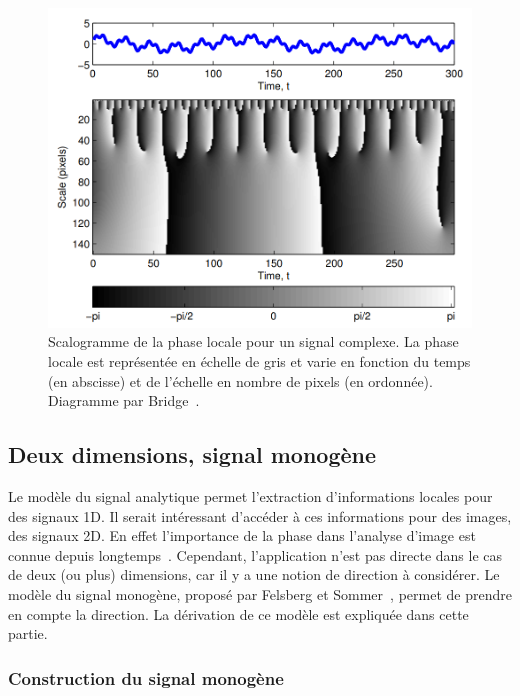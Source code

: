 \begin{figure}
    \centering
    \includegraphics[width=\textwidth]{contenu/resources/images/scalogram}
    \caption[Scalogramme de la phase locale]{Scalogramme de la phase locale pour un signal complexe. La phase locale est représentée en échelle de gris et varie en fonction du temps (en abscisse) et de l'échelle en nombre de pixels (en ordonnée). Diagramme par Bridge~\cite{bridge_introduction_2018}.}
    \label{fig:scalogram}
\end{figure}


\subsection{Deux dimensions, signal monogène}

Le modèle du signal analytique permet l'extraction d'informations locales pour des signaux 1D. Il serait intéressant d'accéder à ces informations pour des images, des signaux 2D. En effet l'importance de la phase dans l'analyse d'image est connue depuis longtemps~\cite{oppenheim_importance_1981}. Cependant, l'application n'est pas directe dans le cas de deux (ou plus) dimensions, car il y a une notion de direction à considérer. Le modèle du signal monogène, proposé par Felsberg et Sommer~\cite{felsberg_monogenic_2001}, permet de prendre en compte la direction. La dérivation de ce modèle est expliquée dans cette partie.

\subsubsection{Construction du signal monogène}

